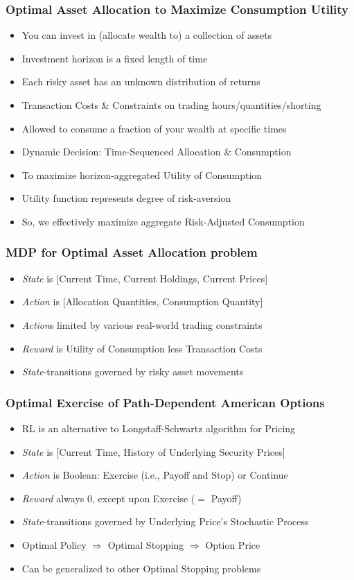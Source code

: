 \documentclass{beamer}
\begin{document}
\begin{frame}
\frametitle{Optimal Asset Allocation to Maximize Consumption Utility}
\begin{itemize}
\item You can invest in (allocate wealth to) a collection of assets
\item Investment horizon is a fixed length of time
\item Each risky asset has an unknown distribution of returns
\item Transaction Costs \& Constraints on trading hours/quantities/shorting
\item Allowed to consume a fraction of your wealth at specific times
\item Dynamic Decision: Time-Sequenced Allocation \& Consumption
\item To maximize horizon-aggregated Utility of Consumption
\item Utility function represents degree of risk-aversion
\item So, we effectively maximize aggregate Risk-Adjusted Consumption
\end{itemize}
\end{frame}

\begin{frame}
\frametitle{MDP for Optimal Asset Allocation problem}
\begin{itemize}
\item {\em State} is [Current Time, Current Holdings, Current Prices]
\item {\em Action} is [Allocation Quantities, Consumption Quantity]
\item {\em Action}s limited by various real-world trading constraints
\item {\em Reward} is Utility of Consumption less Transaction Costs
\item {\em State}-transitions governed by risky asset movements
\end{itemize}
\end{frame}

\begin{frame}
\frametitle{Optimal Exercise of Path-Dependent American Options}
\begin{itemize}
\item RL is an alternative to Longstaff-Schwartz algorithm for Pricing
\item {\em State} is [Current Time, History of Underlying Security Prices]
\item {\em Action} is Boolean: Exercise (i.e., Payoff and Stop) or Continue
\item {\em Reward} always 0, except upon Exercise ($=$ Payoff)
\item {\em State}-transitions governed by Underlying Price's Stochastic Process
\item Optimal Policy $\Rightarrow$ Optimal Stopping $\Rightarrow$ Option Price
\item Can be generalized to other Optimal Stopping problems
\end{itemize}
\end{frame}
\end{document}
